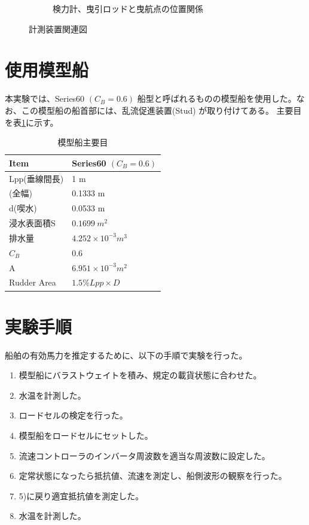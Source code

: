 \documentclass[dvipdfmx,a4paper]{jreport} %
\begin{document}
\begin{figure}[H]
\begin{subfigure}[b]{0.45\textwidth}
        \caption{検力計、曳引ロッドと曳航点の位置関係}
        \label{fig:load_cell_setup}
    \end{subfigure}
    \caption{計測装置関連図}
\end{figure}

\section{使用模型船}
本実験では、Series60 $(C_{B}=0.6)$ 船型と呼ばれるものの模型船を使用した。なお、この模型船の船首部には、乱流促進装置(Stud) が取り付けてある。
主要目を表\ref{tab:model_ship_particulars}に示す。

\begin{table}[htbp]
    \caption{模型船主要目}
    \label{tab:model_ship_particulars}
    \centering
    \begin{tabular}{|l|l|}
    \hline
    \textbf{Item} & \textbf{Series60 $(C_{B}=0.6)$} \\
    \hline
    Lpp(垂線間長) & 1 m \\
    (全幅) & 0.1333 m \\
    d(喫水) & 0.0533 m \\
    浸水表面積S & $0.1699~m^{2}$ \\
    排水量 & $4.252\times10^{-3}m^{3}$ \\
    $C_{B}$ & 0.6 \\
    A & $6.951\times10^{-3}m^{2}$ \\
    Rudder Area & $1.5\%Lpp\times D$ \\
    \hline
    \end{tabular}
\end{table}

\section{実験手順}
船舶の有効馬力を推定するために、以下の手順で実験を行った。

\begin{enumerate}
    \item 模型船にバラストウェイトを積み、規定の載貨状態に合わせた。
    \item 水温を計測した。
    \item ロードセルの検定を行った。
    \item 模型船をロードセルにセットした。
    \item 流速コントローラのインバータ周波数を適当な周波数に設定した。
    \item 定常状態になったら抵抗値、流速を測定し、船側波形の観察を行った。
    \item 5)に戻り適宜抵抗値を測定した。
    \item 水温を計測した。
\end{enumerate}
\end{document}
